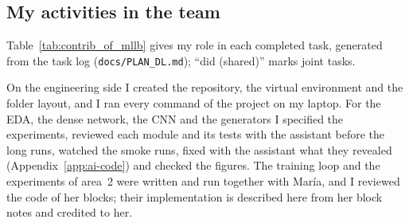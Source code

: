 \subsection{My activities in the team}

Table~\ref{tab:contrib_of_mllb} gives my role in each completed task, generated from the task log
(\texttt{docs/PLAN\_DL.md}); ``did (shared)'' marks joint tasks.

\begin{table}[htbp]
\centering
\caption{My role in each completed task (generated from \texttt{docs/PLAN\_DL.md}).}
\label{tab:contrib_of_mllb}

\end{table}

On the engineering side I created the repository, the virtual environment and the folder layout, and I
ran every command of the project on my laptop. For the EDA, the dense network, the CNN and the
generators I specified the experiments, reviewed each module and its tests with the assistant before
the long runs, watched the smoke runs, fixed with the assistant what they revealed (Appendix~\ref{app:ai-code})
and checked the figures. The training loop and the experiments of area~2 were written and run together
with Mar\'ia, and I reviewed the code of her blocks; their implementation is described here from her
block notes and credited to her.
